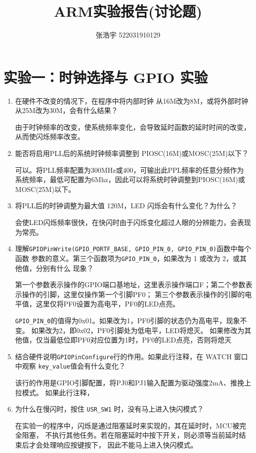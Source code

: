 \documentclass[12pt, a4paper, oneside]{ctexart}
\title{\textbf{ARM实验报告(讨论题)}}
\author{张浩宇 522031910129}
\date{}
\begin{document}
    \maketitle
    \section{实验一：时钟选择与 GPIO 实验}
    \begin{enumerate}[listparindent=2em]
        \item 在硬件不改变的情况下，在程序中将内部时钟
        从16M改为8M，或将外部时钟从25M改为30M，会有什么结果？
        
        {\kaishu 由于时钟频率的改变，使系统频率变化，会导致延时函数的延时时间的改变，从而使闪烁频率改变。}

        \item 能否将启用PLL后的系统时钟频率调整到
        PIOSC(16M)或MOSC(25M)以下？
        
        {\kaishu 可以。将PLL频率配置为300MHz或400，可输出此PPL频率的任意分频作为
        系统频率，最低可配置为6Mhz，因此可以将系统时钟调整到PIOSC(16M)或MOSC(25M)以下。}

        
        \item 将PLL后的时钟调整为最大值 120M，LED 闪烁会有什么变化？为什么？
        
        {\kaishu 会使LED闪烁频率很快，在快闪时由于闪烁变化超过人眼的分辨能力，会表现为常亮。}

        \item 理解\verb|GPIOPinWrite(GPIO_PORTF_BASE, GPIO_PIN_0, GPIO_PIN_0)|函数中每个函数
        参数的意义。第三个函数项为\verb|GPIO_PIN_0|，如果改为 1 或改为 2，或其他值，分别有什么
        现象？

        {\kaishu 第一个参数表示操作的GPIO端口基地址，这里表示操作端口F；第二个参数表示操作的引脚，这里仅操作第一个引脚PF0；
        第三个参数表示操作的引脚的电平值，这里仅将PF0设置为高电平，PF0的LED点亮。

        \verb|GPIO_PIN_0|的值得为0x01。如果改为1，PF0引脚的状态仍为高电平，现象不变。
        如果改为2，即0x02，PF0引脚处为低电平，LED将熄灭。
        如果修改为其他值，仅当最低位即PF0对应位置为1时，PF0的LED点亮，否则将熄灭
        }

        \item 结合硬件说明\verb|GPIOPinConfigure|行的作用。如果此行注释，在 WATCH 窗口中观察
        \verb|key_value|值会有什么变化？

        {\kaishu 该行的作用是GPIO引脚配置，将PJ0和PJ1输入配置为驱动强度2mA、推挽上拉模式。
        如果此行注释，}

        \item 为什么在慢闪时，按住 \verb|USR_SW1| 时，没有马上进入快闪模式？
        
        {\kaishu 在实验一的程序中，闪烁是通过阻塞延时来实现的，其在延时时，MCU被完全阻塞，
        不执行其他任务。若在阻塞延时中按下开关，则必须等当前延时结束后才会处理响应按键按下，
        因此不能马上进入快闪模式。}

       
        
       
       

    \end{enumerate}
\end{document}
